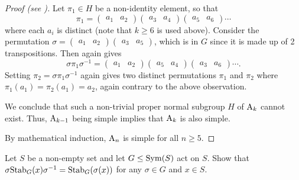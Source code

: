 \begin{proof}[Proof (see {\cite[Theorem 4.24]{dummit_foote_2004}})]
    Let $\pi_1 \in H$ be a non-identity element, so that
    \[
        \pi_1 = \begin{pmatrix}a_1&a_2\end{pmatrix} \begin{pmatrix}a_3&a_4\end{pmatrix} \begin{pmatrix}a_5&a_6\end{pmatrix}\cdots
    \]
    where each $a_i$ is distinct (note that $k \geq 6$ is used above). Consider the permutation $\sigma = \begin{pmatrix}a_1&a_2\end{pmatrix} \begin{pmatrix}a_3&a_5\end{pmatrix}$, which is in $G$ since it is made up of 2 transpositions. Then  again gives
    \[
        \sigma\pi_1\sigma^{-1} = \begin{pmatrix}a_1&a_2\end{pmatrix} \begin{pmatrix}a_5&a_4\end{pmatrix} \begin{pmatrix}a_3&a_6\end{pmatrix}\cdots.
    \]
    Setting $\pi_2 = \sigma\pi_1\sigma^{-1}$ again gives two distinct permutations $\pi_1$ and $\pi_2$ where $\pi_1(a_1) = \pi_2(a_1) = a_2$, again contrary to the above observation.

    We conclude that such a non-trivial proper normal subgroup $H$ of $\mathrm{A}_{k}$ cannot exist. Thus, $\mathrm{A}_{k-1}$ being simple implies that $\mathrm{A}_{k}$ is also simple.

    By mathematical induction, $\mathrm{A}_{n}$ is simple for all $n \geq 5$.
\end{proof}

\begin{exercise}\label{exercise-conjugate-of-stabilizer}
    Let $S$ be a non-empty set and let $G \leq \mathrm{Sym}(S)$ act on $S$. Show that $\sigma\mathrm{Stab}_{G}(x)\sigma^{-1} = \mathrm{Stab}_{G}(\sigma(x))$ for any $\sigma \in G$ and $x \in S$.
\end{exercise}

